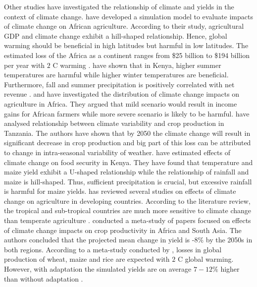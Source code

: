 \documentclass[a4paper,12pt]{article}
\begin{document}
Other studies have investigated the relationship of climate and yields in the context of climate change. \cite{MendelsohnDinar2000} have developed a simulation model to evaluate impacts of climate change on African agriculture. According to their study, agricultural GDP and climate change exhibit a hill-shaped relationship. Hence, global warming should be beneficial in high latitudes but harmful in low latitudes. The estimated loss of the Africa as a continent ranges from \$25 billion to \$194 billion per year with $2$ \textdegree C warming \citep{MendelsohnDinar2000}. \cite{kabubo2007} have shown that in Kenya, higher summer temperatures are harmful while higher winter temperatures are beneficial. Furthermore, fall and summer precipitation is positively correlated with net revenue \citep{kabubo2007}. \cite{KMendelsohn2008} and \cite{SeoMendelsohn} have investigated the distribution of climate change impacts on agriculture in Africa. They argued that mild scenario would result in income gains for African farmers while more severe scenario is likely to be harmful. \cite{Rowhani2011} have analysed relationship between climate variability and crop production in Tanzania. The authors have shown that by 2050 the climate change will result in significant decrease in crop production and big part of this loss can be attributed to change in intra-seasonal variability of weather. \cite{Kabubo2015} have estimated effects of climate change on food security in Kenya. They have found that temperature and maize yield exhibit a U-shaped relationship while the relationship of rainfall and maize is hill-shaped. Thus, sufficient precipitation is crucial, but excessive rainfall is harmful for maize yields.
\cite{Mendelsohn2008} has reviewed several studies on effects of climate change on agriculture in developing countries. According to the literature review, the tropical and sub-tropical countries are much more sensitive to climate change than temperate agriculture \citep{Mendelsohn2008}. \cite{Knox2012} conducted a meta-study of papers focused on effects of climate change impacts on crop productivity in Africa and South Asia. The authors concluded that the projected mean change in yield is -$8\%$ by the 2050s in both regions. According to a meta-study conducted by \cite{Challinor2014}, losses in global production of wheat, maize and rice are expected with $2$ \textdegree C global warming. However, with adaptation the simulated yields are on average $7-12\%$ higher than without adaptation \citep{Challinor2014}.
\end{document}

